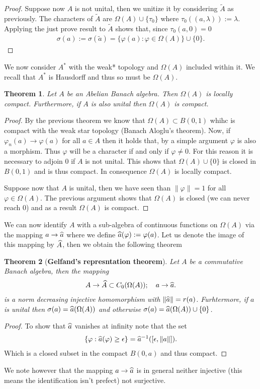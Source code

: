 \documentclass[12pt]{article}
\newtheorem{theorem}{Theorem}
\renewcommand{\norm}[1]{\lVert #1 \rVert}\renewcommand{\abs}[1]{\left| #1 \right|}
\begin{document}
\begin{CJK*}{UTF8}{gbsn}
\begin{proof}
		Suppose now $A$ is not unital, then we unitize it by considering  $\tilde{A}$ as previously. The characters of $\tilde{A}$ are $\Omega(A) \cup \{\tau_0\} $ where $\tau_0((a,\lambda )):= \lambda $. Applying the just prove result to $\tilde{A}$ shows that, since $\tau_0(a,0)=0$
		\begin{align*}
			\sigma (a):=\sigma (\tilde{a})=\{\varphi(a): \varphi \in \Omega(A)\} \cup \{0\}  .
		\end{align*}
	\end{proof}
	We now consider $A^*$ with the weak* topology and  $\Omega(A)$ included within it. We recall that $A^*$ is Hausdorff and thus so must be  $\Omega(A)$.
	\begin{theorem}Let $A$ be an Abelian Banach algebra. Then $\Omega(A)$ is locally compact. Furthermore, if $A$ is also unital then  $\Omega(A)$ is compact.
	\end{theorem}
	\begin{proof}
		By the previous theorem we know that $\Omega(A) \subset B(0,1)$ whihc is compact with the weak star topology (Banach Aloglu's theorem). Now, if $\varphi_n(a) \to \varphi(a)$ for all $a \in A$ then it holds that, by a simple argument $\varphi$ is also a morphism.  Thus $\varphi$ will be a character if and only if $\varphi \neq 0$. For this reason it is necessary to adjoin $0$ if $A$ is not unital. This shows that  $\Omega(A) \cup  \{0\} $ is closed in $B(0,1)$ and is thus compact. In consequence  $\Omega(A)$ is locally compact.

		Suppose now that $A$ is unital, then  we have seen than $\norm{\varphi}=1$ for all $\varphi \in  \Omega(A)$. The previous argument shows that $\Omega(A)$ is closed (we can never reach $0$) and as a result $\Omega(A)$ is compact.
	\end{proof}
	We can now identify $A$ with a sub-algebra of continuous functions on $\Omega(A)$ via the mapping $a \to \widehat{a}$ where we define $\widehat{a}(\varphi):= \varphi(a)$. Let us denote the image of this mapping by $\widehat{A}$, then we obtain the following theorem
	\begin{theorem}[\textbf{Gelfand's represntation theorem}]
		Let $A$ be a commutative Banach algebra, then the mapping
		\begin{align*}
			A \to\widehat{A} \subset C_0(\Omega(A)); \quad a\to \widehat{a}.
		\end{align*}
		is a norm decreasing  injective homomorphism with $\norm{\wh{a}}= r(a)$. Furhtermore, if $a$ is unital then  $\sigma (a)=\widehat{a}(\Omega(A))$ and otherwise $\sigma (a)=\widehat{a}(\Omega(A)) \cup  \{0\}$.
	\end{theorem}
	\begin{proof}
		To show that $\widehat{a}$ vanishes at infinity note that the set
		\begin{align*}
			\{\varphi : \wh{a}(\varphi) \geq \epsilon \} =\wh{a}^{-1}([\epsilon ,\norm{a}]).
		\end{align*}
		Which is a closed subset in the compact $B(0,a)$ and thus compact.
	\end{proof}
	We note however that the mapping $a \to \widehat{a}$ is in general neither injective (this means the identification isn't prefect) not surjective.


\end{CJK*}
\end{document}
